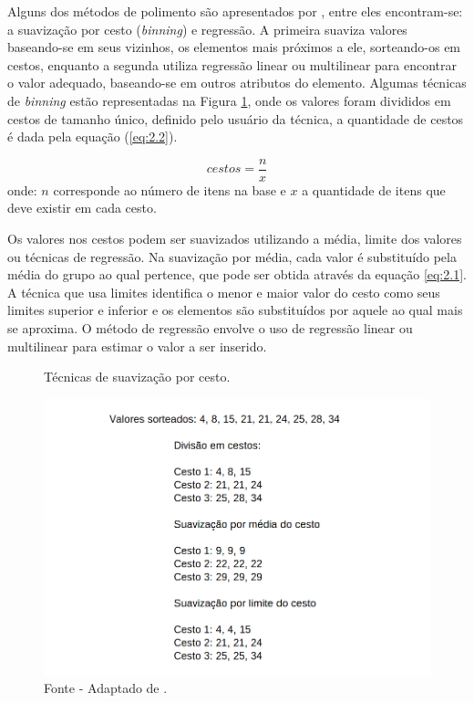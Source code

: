 Alguns dos métodos de polimento são apresentados por , entre eles encontram-se: a suavização por cesto (\textit{binning}) e regressão. A primeira suaviza valores baseando-se em seus vizinhos, os elementos mais próximos a ele, sorteando\hyp{}os em cestos, enquanto a segunda utiliza regressão linear ou multilinear para encontrar o valor adequado, baseando\hyp{}se em outros atributos do elemento. Algumas técnicas de \textit{binning} estão representadas na Figura \ref{fig:binning}, onde os valores foram divididos em cestos de tamanho único, definido pelo usuário da técnica, a quantidade de cestos é dada pela equação (\ref{eq:2.2}).

\begin{equation}
    cestos = \frac{n}{x}
    \label{eq:2.2}
\end{equation}
onde: $n$ corresponde ao número de itens na base e $x$ a quantidade de itens que deve existir em cada cesto.

Os valores nos cestos podem ser suavizados utilizando a média, limite dos valores ou técnicas de regressão. Na suavização por média, cada valor é substituído pela média do grupo ao qual pertence, que pode ser obtida através da equação \ref{eq:2.1}. A técnica que usa limites identifica o menor e maior valor do cesto como seus limites superior e inferior e os elementos são substituídos por aquele ao qual mais se aproxima. O método de regressão envolve o uso de regressão linear ou multilinear para estimar o valor a ser inserido.

\begin{figure}[H]
    \centering
    \caption{Técnicas de suavização por cesto.}
    \includegraphics[width=0.9\linewidth]{figuras/binning.png}
    \caption*{Fonte - Adaptado de \cite{han2000data}.}
    \label{fig:binning}
\end{figure}

